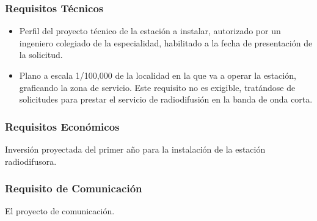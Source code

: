 \documentclass[a4paper]{IEEEtran} %
\begin{document}
\subsubsection{Requisitos Técnicos}

\begin{itemize}
	\item Perfil  del  proyecto  técnico  de  la  estación  a 
	instalar,  autorizado  por  un  ingeniero  colegiado 
	de la especialidad, habilitado a la fecha de 
	presentación de la solicitud. 
	\item Plano a escala 1/100,000 de la localidad en la 
	que va a operar la estación, graficando la zona 
	de servicio. Este requisito no es exigible, 
	tratándose de solicitudes para prestar el servicio 
	de radiodifusión en la banda de onda corta.
\end{itemize}

\subsubsection{Requisitos Económicos}

Inversión proyectada del primer año para la 
instalación de la estación radiodifusora. 

\subsubsection{Requisito de Comunicación}
El proyecto de comunicación. 
\end{document}
